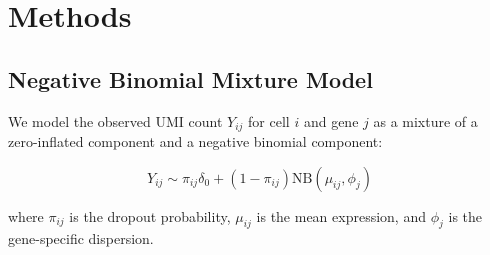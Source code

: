\chapter{Methods}

\section{Negative Binomial Mixture Model}

We model the observed UMI count $Y_{ij}$ for cell $i$ and gene $j$ as a
mixture of a zero-inflated component and a negative binomial component:

\begin{equation}
Y_{ij} \sim \pi_{ij} \delta_0 + (1 - \pi_{ij}) \text{NB}(\mu_{ij}, \phi_j)
\end{equation}

where $\pi_{ij}$ is the dropout probability, $\mu_{ij}$ is the mean
expression, and $\phi_j$ is the gene-specific dispersion.


